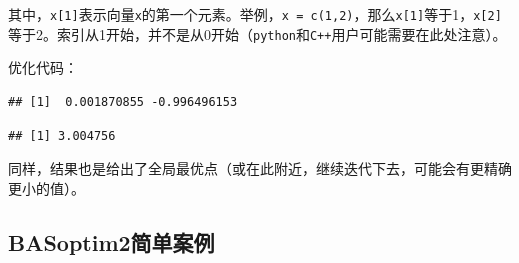\documentclass[]{ctexbook}
\newenvironment{Shaded}{\begin{snugshade}}{\end{snugshade}}
\newcommand{\KeywordTok}[1]{\textcolor[rgb]{0.13,0.29,0.53}{\textbf{#1}}}
\newcommand{\DataTypeTok}[1]{\textcolor[rgb]{0.13,0.29,0.53}{#1}}
\newcommand{\DecValTok}[1]{\textcolor[rgb]{0.00,0.00,0.81}{#1}}
\newcommand{\StringTok}[1]{\textcolor[rgb]{0.31,0.60,0.02}{#1}}
\newcommand{\OtherTok}[1]{\textcolor[rgb]{0.56,0.35,0.01}{#1}}
\newcommand{\OperatorTok}[1]{\textcolor[rgb]{0.81,0.36,0.00}{\textbf{#1}}}
\newcommand{\NormalTok}[1]{#1}
\begin{document}
其中，\texttt{x{[}1{]}}表示向量\texttt{x}的第一个元素。举例，\texttt{x\ =\ c(1,2)}，那么\texttt{x{[}1{]}}等于1，\texttt{x{[}2{]}}等于2。索引从1开始，并不是从0开始（\texttt{python}和\texttt{C++}用户可能需要在此处注意）。

优化代码：

\begin{Shaded}
\end{Shaded}

\begin{verbatim}
## [1]  0.001870855 -0.996496153
\end{verbatim}

\begin{Shaded}
\end{Shaded}

\begin{verbatim}
## [1] 3.004756
\end{verbatim}

同样，结果也是给出了全局最优点（或在此附近，继续迭代下去，可能会有更精确更小的值）。

\subsection{BASoptim2简单案例}\label{BAS2examples}
\end{document}

